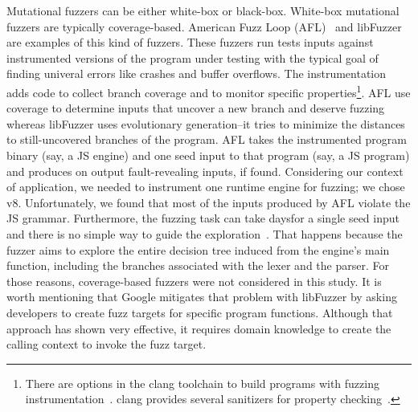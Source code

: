 \documentclass[10pt,conference,anonymous]{IEEEtran}
\begin{document}

Mutational fuzzers can be either white-box or black-box. White-box
mutational fuzzers are typically coverage-based. American Fuzz Loop
(AFL)~\cite{afl} and libFuzzer~\cite{libfuzzer} are examples of this
kind of fuzzers. These fuzzers run tests inputs against instrumented
versions of the program under testing with the typical goal of finding
univeral errors like crashes and buffer overflows. The instrumentation
adds code to collect branch coverage and to monitor specific
properties\footnote{There are options in the clang toolchain to build
  programs with fuzzing instrumentation~\cite{libfuzzer}. clang
  provides several sanitizers for property
  checking~\cite{clang-documentation}.}. AFL use coverage to determine
inputs that uncover a new branch and deserve fuzzing whereas libFuzzer
uses evolutionary generation--it tries to minimize the distances to
still-uncovered branches of the program. AFL takes the instrumented
program binary (say, a JS engine) and one seed input to that program
(say, a JS program) and produces on output fault-revealing inputs, if
found. Considering our context of application, we needed to instrument
one runtime engine for fuzzing; we chose v8. Unfortunately, we found
that most of the inputs produced by AFL violate the JS
grammar. Furthermore, the fuzzing task can take daysfor a single seed
input and there is no simple way to guide the
exploration~. That happens because the fuzzer aims to
explore the entire decision tree induced from the engine's main
function, including the branches associated with the lexer and the
parser. For those reasons, coverage-based fuzzers were not considered
in this study. It is worth mentioning that Google mitigates that
problem with libFuzzer by asking developers to create fuzz targets for
specific program
functions\cite{libFuzzer-tutorial-google,libFuzzer-chromium-google}. Although
that approach has shown very effective, it requires domain knowledge
to create the calling context to invoke the fuzz target.

\end{document}
